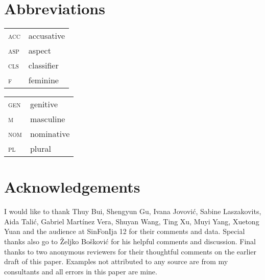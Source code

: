 \documentclass[output=paper]{langscibook}
\begin{document}
%

\section*{Abbreviations}

\begin{tabularx}{.5\textwidth}{@{}lX@{}}
\textsc{acc}&{accusative}\\
\textsc{asp}&{aspect}\\
\textsc{cls}&{classifier}\\
\textsc{f}&feminine\\
\end{tabularx}%
\begin{tabularx}{.5\textwidth}{@{}lX@{}}
\textsc{gen}&genitive\\
\textsc{m}&masculine\\
\textsc{nom}&{nominative}\\
\textsc{pl}&plural\\
\end{tabularx}

\section*{Acknowledgements}
I would like to thank Thuy Bui, Shengyun Gu, Ivana Jovović, Sabine Laszakovits, Aida Talić, Gabriel Martínez Vera, Shuyan Wang, Ting Xu, Muyi Yang, Xuetong Yuan and the audience at SinFonIja 12 for their comments and data. Special thanks also go to \v{Z}eljko Bo\v{s}kovi\'c for his helpful comments and discussion. Final thanks to two anonymous reviewers for their thoughtful comments on the earlier draft of this paper. Examples not attributed to any source are from my consultants and all errors in this paper are mine.

{\sloppy\printbibliography[heading=subbibliography,notkeyword=this]}
\end{document}
